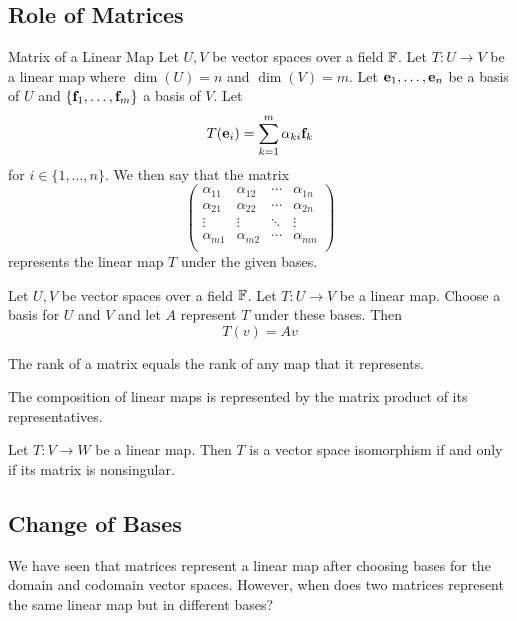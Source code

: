 \documentclass[a4paper]{article}
\begin{document}
\subsection{Role of Matrices}
\begin{defn}{Matrix of a Linear Map}{} Let $U,V$ be vector spaces over a field $\mathbb{F}$. Let $T:U\to V$ be a linear map where $\dim(U)=n$ and $\dim(V)=m$. Let $\vb{e}_1,\dots,\vb{e}_n$ be a basis of $U$ and $\{\vb{f}_1,\dots,\vb{f}_m\}$ a basis of $V$. Let $$T(\vb{e}_i)=\sum_{k=1}^m\alpha_{ki}\vb{f}_k$$ for $i\in\{1,\dots,n\}$. We then say that the matrix $$\begin{pmatrix}
\alpha_{11} & \alpha_{12} & \cdots & \alpha_{1n}\\
\alpha_{21} & \alpha_{22} & \cdots & \alpha_{2n}\\
\vdots & \vdots & \ddots & \vdots\\
\alpha_{m1} & \alpha_{m2} & \cdots & \alpha_{mn}\\
\end{pmatrix}$$ represents the linear map $T$ under the given bases. 
\end{defn}

\begin{thm}{}{} Let $U,V$ be vector spaces over a field $\mathbb{F}$. Let $T:U\to V$ be a linear map. Choose a basis for $U$ and $V$ and let $A$ represent $T$ under these bases. Then $$T(v)=Av$$
\end{thm}

\begin{thm}{}{} The rank of a matrix equals the rank of any map that it represents. 
\end{thm}

\begin{thm}{}{} The composition of linear maps is represented by the matrix product of its representatives. 
\end{thm}

\begin{thm}{}{} Let $T:V\to W$ be a linear map. Then $T$ is a vector space isomorphism if and only if its matrix is nonsingular. 
\end{thm}

\subsection{Change of Bases}
We have seen that matrices represent a linear map after choosing bases for the domain and codomain vector spaces. However, when does two matrices represent the same linear map but in different bases?
\end{document}
